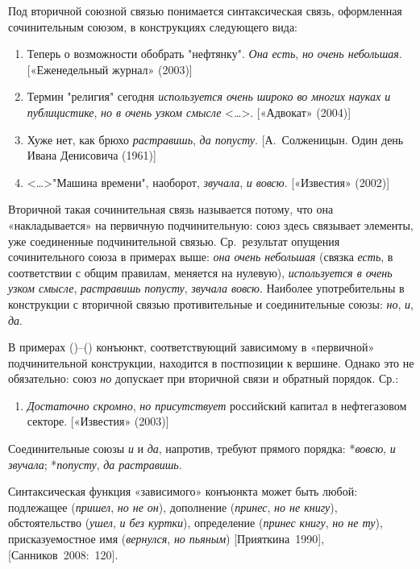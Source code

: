 Под вторичной союзной связью понимается синтаксическая связь,
оформленная сочинительным союзом, в конструкциях следующего вида:

\begin{enumerate}
\def\labelenumi{(\arabic{enumi})}
\setcounter{enumi}{43}
\item
  Теперь о возможности обобрать "нефтянку". \emph{Она есть}, \emph{но
  очень небольшая}. {[}«Еженедельный журнал» (2003){]}
\item
  Термин "религия" сегодня \emph{используется очень широко во многих
  науках и публицистике}, \emph{но в очень узком смысле}
  \textless\ldots\textgreater. {[}«Адвокат» (2004){]}
\item
  Хуже нет, как брюхо \emph{растравишь}, \emph{да попусту}.
  {[}А.~Солженицын. Один день Ивана Денисовича (1961){]}
\item
  \textless\ldots\textgreater"Машина времени", наоборот, \emph{звучала},
  \emph{и вовсю}. {[}«Известия» (2002){]}
\end{enumerate}

Вторичной такая сочинительная связь называется потому, что она
«накладывается» на первичную подчинительную: союз здесь связывает
элементы, уже соединенные подчинительной связью. Ср.~результат опущения
сочинительного союза в примерах выше: \emph{она очень небольшая} (связка
\emph{есть}, в соответствии с общим правилам, меняется на нулевую),
\emph{используется в очень узком смысле}, \emph{растравишь попусту},
\emph{звучала вовсю}. Наиболее употребительны в конструкции с вторичной
связью противительные и соединительные союзы: \emph{но}, \emph{и},
\emph{да}.

В примерах ()--() конъюнкт, соответствующий зависимому в «первичной»
подчинительной конструкции, находится в постпозиции к вершине. Однако
это не обязательно: союз \emph{но} допускает при вторичной связи и
обратный порядок. Ср.:

\begin{enumerate}
\def\labelenumi{(\arabic{enumi})}
\setcounter{enumi}{47}
\item
  \emph{Достаточно скромно}, \emph{но присутствует} российский капитал в
  нефтегазовом секторе. {[}«Известия» (2003){]}
\end{enumerate}

Соединительные союзы \emph{и} и \emph{да}, напротив, требуют прямого
порядка: *\emph{вовсю}, \emph{и звучала}; *\emph{попусту}, \emph{да
растравишь}.

Синтаксическая функция «зависимого» конъюнкта может быть любой:
подлежащее (\emph{пришел}, \emph{но не он}), дополнение (\emph{принес},
\emph{но не книгу}), обстоятельство (\emph{ушел}, \emph{и без куртки}),
определение (\emph{принес книгу}, \emph{но не ту}), присказуемостное имя
(\emph{вернулся}, \emph{но пьяным}) {[}Прияткина~1990{]},
{[}Санников~2008:~120{]}.

